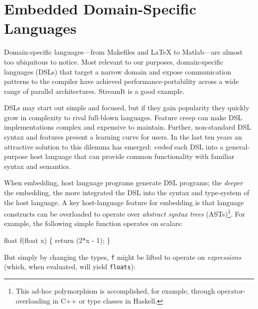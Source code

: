 \documentclass[conference]{IEEEtran}
\newcommand{\cde}[1]{{\footnotesize \tt #1}}
\begin{document}
\section{Embedded Domain-Specific Languages}


Domain-specific languages---from Makefiles and \LaTeX{} to
Matlab---are almost too ubiquitous to notice.  Most relevant to our
purposes, domain-specific languages (DSLs) that target a narrow domain and expose communication
patterns to the compiler 
 have achieved performance-portability across a wide range of parallel
architectures.  
StreamIt\cite{streamit} is a good example.
% 

DSLs may start out simple and focused, but if they gain popularity
they quickly grow in complexity to rival full-blown languages.
Feature creep
can make DSL implementations complex and expensive to maintain.
Further, non-standard DSL syntax and features present a learning curve for users.  In the
last ten years an attractive solution to this dilemma has emerged: {\em
  embed} each DSL into a general-purpose host language that can provide
common functionality with familiar syntax and semantics.

When embedding, host language programs {generate} DSL programs;
the {\em deeper} the embedding, the more integrated the
DSL into the syntax and type-system of the host language.
%
A key host-language feature for embedding is that
language constructs can be overloaded to operate over {\em abstract
  syntax trees} (ASTs)\footnote{This ad-hoc polymorphism is accomplished,
for example, through operator-overloading in C++ or type classes in
Haskell.}.  For example, the following simple function operates on scalars:

\vspace{1mm}
\begin{code}
  float f(float x) \{ return (2*x - 1); \}
\end{code}
\noindent
But simply by changing the types, \cde{f} might be lifted to operate on {\em
  expressions} (which, when evaluated, will yield \cde{floats}):
\end{document}
